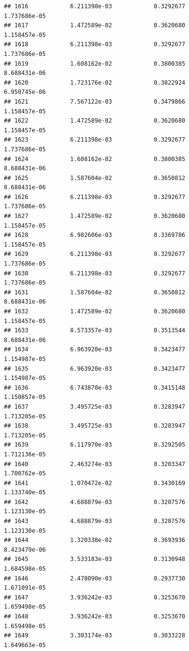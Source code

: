 \documentclass[
]{article}
\begin{document}
\begin{verbatim}
## 1616            6.211398e-03            0.3292677            1.737686e-05
## 1617            1.472589e-02            0.3620680            1.158457e-05
## 1618            6.211398e-03            0.3292677            1.737686e-05
## 1619            1.608162e-02            0.3800385            8.688431e-06
## 1620            1.723176e-02            0.3822924            6.950745e-06
## 1621            7.567122e-03            0.3479866            1.158457e-05
## 1622            1.472589e-02            0.3620680            1.158457e-05
## 1623            6.211398e-03            0.3292677            1.737686e-05
## 1624            1.608162e-02            0.3800385            8.688431e-06
## 1625            1.587604e-02            0.3650812            8.688431e-06
## 1626            6.211398e-03            0.3292677            1.737686e-05
## 1627            1.472589e-02            0.3620680            1.158457e-05
## 1628            6.982606e-03            0.3369786            1.158457e-05
## 1629            6.211398e-03            0.3292677            1.737686e-05
## 1630            6.211398e-03            0.3292677            1.737686e-05
## 1631            1.587604e-02            0.3650812            8.688431e-06
## 1632            1.472589e-02            0.3620680            1.158457e-05
## 1633            8.573357e-03            0.3513544            8.688431e-06
## 1634            6.963920e-03            0.3423477            1.154987e-05
## 1635            6.963920e-03            0.3423477            1.154987e-05
## 1636            6.743870e-03            0.3415148            1.150857e-05
## 1637            3.495725e-03            0.3283947            1.713205e-05
## 1638            3.495725e-03            0.3283947            1.713205e-05
## 1639            6.117970e-03            0.3292505            1.712136e-05
## 1640            2.463274e-03            0.3203347            1.700762e-05
## 1641            1.070472e-02            0.3430169            1.133740e-05
## 1642            4.688879e-03            0.3207576            1.123130e-05
## 1643            4.688879e-03            0.3207576            1.123130e-05
## 1644            1.320338e-02            0.3693936            8.423479e-06
## 1645            3.533183e-03            0.3130948            1.684598e-05
## 1646            2.478090e-03            0.2937730            1.671091e-05
## 1647            3.936242e-03            0.3253670            1.659498e-05
## 1648            3.936242e-03            0.3253670            1.659498e-05
## 1649            3.303174e-03            0.3033228            1.649663e-05

\end{verbatim}
\end{document}
